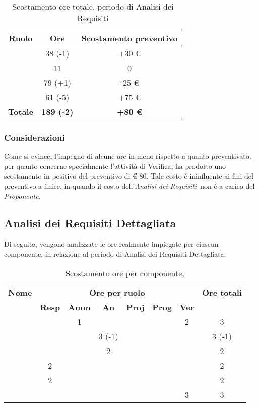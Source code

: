 \begin{table}[H]
	\begin{center}
		\begin{tabular}{|c|c|c|}
			\hline
			\textbf{Ruolo}	& \textbf{Ore}	& \textbf{Scostamento preventivo} \\
			\hline
			\Res	&	38 (-1)	&  +30 € \\
			\hline
			\Amm	&	11	&  0 \\
			\hline
			\Ana	&	79 (+1)	&  -25 € \\
			\hline
			\Ver	&	61 (-5)	&  +75 €\\
			\hline
			\textbf{Totale} & \textbf{189 (-2)} & \textbf{+80 €}\\
			\hline
		\end{tabular}
	\end{center}
	\caption{Scostamento ore totale, periodo di Analisi dei Requisiti}
\end{table}

\subsubsection{Considerazioni}
Come si evince, l'impegno di alcune ore in meno rispetto a quanto preventivato, per quanto concerne specialmente l'attività di Verifica, ha prodotto uno scostamento in positivo del preventivo di € 80. Tale costo è ininfluente ai fini del preventivo a finire, in quando il costo dell'\textit{Analisi dei Requisiti}\ non è a carico del \textit{Proponente}.


\subsection{Analisi dei Requisiti Dettagliata}

Di seguito, vengono analizzate le ore realmente impiegate per ciascun componente, in relazione al periodo di Analisi dei Requisiti Dettagliata.

\begin{table}[H]
	\begin{center}
		\begin{tabular}{|c|c|c|c|c|c|c|c|}
			\hline
			\textbf{Nome} & \multicolumn{6}{c|}{\textbf{Ore per ruolo}} & \textbf{Ore totali} \\\cline{2-7}
			& \textbf{Resp} & \textbf{Amm} & \textbf{An} & \textbf{Proj} & \textbf{Prog} & \textbf{Ver} & \\
			\hline
			\MC			&		&	1	&	 	&		&		&	2 	&	 3	\\
			\hline
			\AN			&		&		&	3 (-1) 	&	 	&		&	 	& 	 3 (-1)	\\
			\hline
			\DAN		&		&	 	&	2 	&		&		&		&	 2	\\
			\hline
			\AS			&	2	&	 	&	  	&		&	 	& 		&	 2	\\
			\hline
			\NS 		&	2	&		&	 	&		&		& 		&	 2	\\
			\hline
			\DS			& 		&	 	&	 	&		&		&	3 	&	 3	\\
			\hline
		\end{tabular}
	\end{center}
	\caption{Scostamento ore per componente, \ARD}
\end{table}

